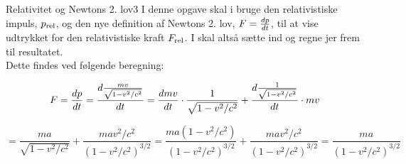 \begin{opgave}{Relativitet og Newtons 2. lov}{3}
	I denne opgave skal i bruge den relativistiske impuls, $p_{\text{rel}}$, og den nye definition af Newtons 2. lov, $F = {d{p} \over d{t}}$, til at vise udtrykket for den relativistiske kraft $F_{\text{rel}}$. I skal altså sætte ind og regne jer frem til resultatet.\\
	
	Dette findes ved følgende beregning:
	
	$$F = {d{p} \over d{t}} = {d{\frac{mv}{\sqrt{1-v^2/c^2}}} \over d{t}} = {d{mv} \over d{t}} \cdot \frac{1}{\sqrt{1-v^2/c^2}} + {d{\frac{1}{\sqrt{1-v^2/c^2}}} \over d{t}} \cdot mv  $$
	
	$$= \frac{ma}{\sqrt{1-v^2/c^2}} + \frac{mav^2/c^2}{\left( 1-v^2/c^2 \right)^{3/2}} = \frac{ma \left( 1 - v^2/c^2 \right)}{\left( 1-v^2/c^2 \right)^{3/2}} + \frac{mav^2/c^2}{\left( 1-v^2/c^2 \right)^{3/2}} = \frac{ma}{\left( 1-v^2/c^2 \right)^{3/2}} $$
\end{opgave}

